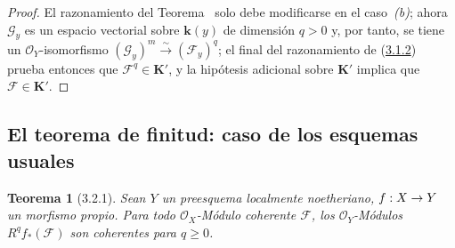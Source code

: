\documentclass[10pt,oneside,openany]{book}
\theoremstyle{egaenv}\newtheorem*{env}{---}
\theoremstyle{egastatement}
\newtheorem*{theorem}{Teorema}
\theoremstyle{egadescription}
\renewcommand{\geq}{\geqslant}
\renewcommand{\to}{\mathchoice{\longrightarrow}{\rightarrow}{\rightarrow}{\rightarrow}}
\begin{document}
\begin{proof}
El razonamiento del Teorema~ solo debe modificarse en el caso~\textit{(b)}; ahora $\mathcal G_y$ es un espacio vectorial sobre $\boldsymbol{k}(y)$ de dimensión $q>0$ y, por tanto, se tiene un $\mathcal O_Y$-isomorfismo $(\mathcal G_y)^m\xrightarrow{\sim}(\mathcal F_y)^q$; el final
del razonamiento de (\hyperref[III.3.1.2-fr]{3.1.2}) prueba entonces que
$\mathcal F^q\in\boldsymbol{K}'$, y la hipótesis adicional sobre $\boldsymbol{K}'$ implica que
$\mathcal F\in\boldsymbol{K}'$.
\end{proof}

\subsection{El teorema de finitud: caso de los esquemas usuales}
\label{subsection:III.3.2-fr}

\begin{theorem}[3.2.1]
\label{III.3.2.1-fr}
Sean $Y$ un preesquema localmente noetheriano, $f:X\to Y$ un morfismo
propio. Para todo $\mathcal O_X$-Módulo coherente $\mathcal F$, los
$\mathcal O_Y$-Módulos $R^qf_*(\mathcal F)$ son coherentes para $q\geq0$.
\end{theorem}
\end{document}
